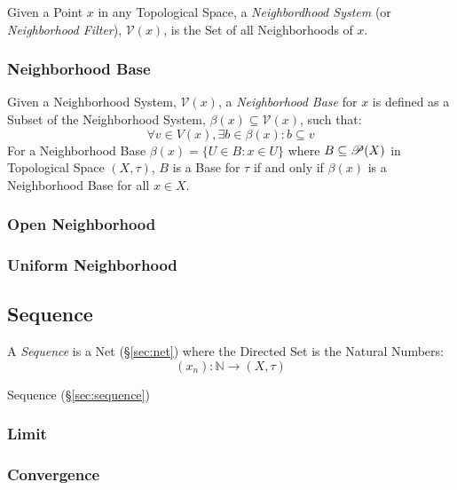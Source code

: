 Given a Point $x$ in any Topological Space, a \emph{Neighbordhood
  System} (or \emph{Neighborhood Filter}), $\mathcal{V}(x)$, is the
Set of all Neighborhoods of $x$.



\subsubsection{Neighborhood Base}\label{sec:neighborhood_base}

Given a Neighborhood System, $\mathcal{V}(x)$, a \emph{Neighborhood
  Base} for $x$ is defined as a Subset of the Neighborhood System,
$\beta(x) \subseteq \mathcal{V}(x)$, such that:
\[
  \forall v \in V(x), \exists b \in \beta(x) : b \subseteq v
\]
For a Neighborhood Base $\beta(x) = \{ U \in B : x \in U \}$ where $B
\subseteq \mathscr{P}(X)$ in Topological Space $(X,\tau)$, $B$ is a
Base for $\tau$ if and only if $\beta(x)$ is a Neighborhood Base for
all $x \in X$.



\subsubsection{Open Neighborhood}\label{sec:open_neighborhood}

\subsubsection{Uniform Neighborhood}\label{sec:uniform_neighborhood}



\subsection{Sequence}\label{sec:sequence_topology}

A \emph{Sequence} is a Net (\S\ref{sec:net}) where the Directed Set is
the Natural Numbers:
\[
  (x_n) : \mathbb{N} \rightarrow (X,\tau)
\]

Sequence (\S\ref{sec:sequence})



\subsubsection{Limit}\label{sec:limit_topology}

\subsubsection{Convergence}\label{sec:convergence_topology}


